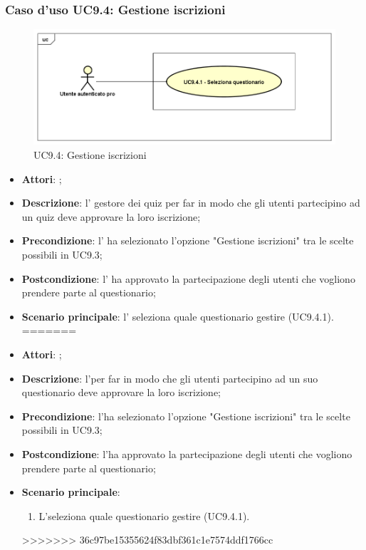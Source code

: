 	 \subsubsection{Caso d'uso UC9.4: Gestione iscrizioni}
	 \label{UC9.4}
	 \begin{figure}[h]
	 	\centering
	 	\includegraphics[scale=0.5,keepaspectratio]{UML/UC9_4.png}
	 	\caption{UC9.4: Gestione iscrizioni}
	 \end{figure}
	 \FloatBarrier
	 \begin{itemize}
<<<<<<< HEAD
	 	\item \textbf{Attori}: \uaupro{};
	 	\item \textbf{Descrizione}: l'\uaupro{} gestore dei quiz per far in modo che gli utenti partecipino ad un quiz deve approvare la loro iscrizione;
	 	\item \textbf{Precondizione}: l'\uaupro{} ha selezionato l'opzione "Gestione iscrizioni" tra le scelte possibili in UC9.3;
	 	\item \textbf{Postcondizione}: l'\uaupro{} ha approvato la partecipazione degli utenti che vogliono prendere parte al questionario;
	 	\item \textbf{Scenario principale}: l'\uaupro{} seleziona quale questionario gestire (UC9.4.1).
=======
	 	\item \textbf{Attori}: \uaupro;
	 	\item \textbf{Descrizione}: l'\uaupro per far in modo che gli utenti partecipino ad un suo questionario deve approvare la loro iscrizione;
	 	\item \textbf{Precondizione}: l'\uaupro ha selezionato l'opzione "Gestione iscrizioni" tra le scelte possibili in UC9.3;
	 	\item \textbf{Postcondizione}: l'\uaupro ha approvato la partecipazione degli utenti che vogliono prendere parte al questionario;
	 	\item \textbf{Scenario principale}: 
	 	\begin{enumerate}
	 		\item L'\uaupro seleziona quale questionario gestire (UC9.4.1).
	 	\end{enumerate}
>>>>>>> 36c97be15355624f83dbf361c1e7574ddf1766cc
	 \end{itemize}
	 

